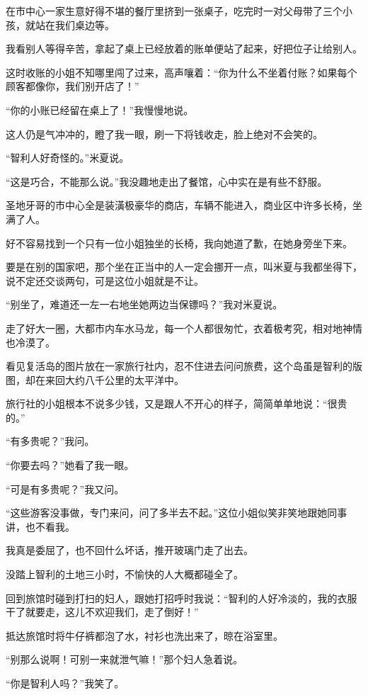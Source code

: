 \par 在市中心一家生意好得不堪的餐厅里挤到一张桌子，吃完时一对父母带了三个小孩，就站在我们桌边等。
\par 我看别人等得辛苦，拿起了桌上已经放着的账单便站了起来，好把位子让给别人。
\par 这时收账的小姐不知哪里闯了过来，高声嚷着：“你为什么不坐着付账？如果每个顾客都像你，我们别开店了！”
\par “你的小账已经留在桌上了！”我慢慢地说。
\par 这人仍是气冲冲的，瞪了我一眼，刷一下将钱收走，脸上绝对不会笑的。
\par “智利人好奇怪的。”米夏说。
\par “这是巧合，不能那么说。”我没趣地走出了餐馆，心中实在是有些不舒服。
\par 圣地牙哥的市中心全是装潢极豪华的商店，车辆不能进入，商业区中许多长椅，坐满了人。
\par 好不容易找到一个只有一位小姐独坐的长椅，我向她道了歉，在她身旁坐下来。
\par 要是在别的国家吧，那个坐在正当中的人一定会挪开一点，叫米夏与我都坐得下，说不定还交谈两句，可是这位小姐就是不让。
\par “别坐了，难道还一左一右地坐她两边当保镖吗？”我对米夏说。
\par 走了好大一圈，大都市内车水马龙，每一个人都很匆忙，衣着极考究，相对地神情也冷漠了。
\par 看见复活岛的图片放在一家旅行社内，忍不住进去问问旅费，这个岛虽是智利的版图，却在来回大约八千公里的太平洋中。
\par 旅行社的小姐根本不说多少钱，又是跟人不开心的样子，简简单单地说：“很贵的。”
\par “有多贵呢？”我问。
\par “你要去吗？”她看了我一眼。
\par “可是有多贵呢？”我又问。
\par “这些游客没事做，专门来问，问了多半去不起。”这位小姐似笑非笑地跟她同事讲，也不看我。
\par 我真是委屈了，也不回什么坏话，推开玻璃门走了出去。
\par 没踏上智利的土地三小时，不愉快的人大概都碰全了。
\par 回到旅馆时碰到打扫的妇人，跟她打招呼时我说：“智利的人好冷淡的，我的衣服干了就要走，这儿不欢迎我们，走了倒好！”
\par 抵达旅馆时将牛仔裤都泡了水，衬衫也洗出来了，晾在浴室里。
\par “别那么说啊！可别一来就泄气嘛！”那个妇人急着说。
\par “你是智利人吗？”我笑了。
